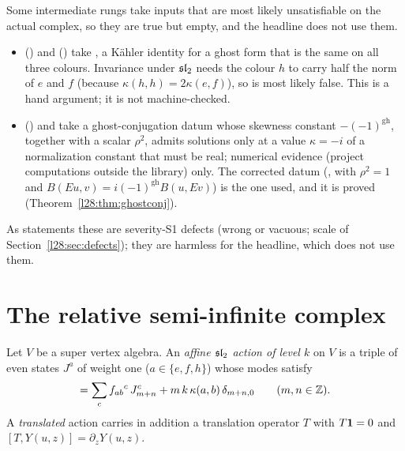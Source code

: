 \begin{warning}[title={Probably vacuous rungs}]\label{l28:warn:vacuous}
Some intermediate rungs take inputs that are most likely unsatisfiable on the actual complex, so they are true but empty, and the
headline does not use them.
\begin{itemize}
\item {} () and
   () take , a
  Kähler identity for a ghost form that is the same on all three colours. Invariance under $\mathfrak{sl}_2$ needs the colour
  $h$ to carry half the norm of $e$ and $f$ (because $\kappa(h,h)=2\kappa(e,f)$), so  is most likely false. This is a
  hand argument; it is not machine-checked.
\item {} () and  take a ghost-conjugation datum
   whose skewness constant $-(-1)^{\mathrm{gh}}$, together with a scalar $\rho^2$, admits solutions only at a
  value $\kappa=-i$ of a normalization constant that must be real; numerical evidence (project computations outside the library) only.
  The corrected datum (, with $\rho^2=1$ and $B(Eu,v)=i(-1)^{\mathrm{gh}}B(u,Ev)$) is the one used, and it is
  proved (Theorem~\ref{l28:thm:ghostconj}).
\end{itemize}
As statements these are severity-S1 defects (wrong or vacuous; scale of Section~\ref{l28:sec:defects}); they are harmless for the headline, which does not use them.
\end{warning}

\section{The relative semi-infinite complex}\label{l28:sec:brst}

\begin{definition}\label{l28:def:action}
Let $V$ be a super vertex algebra. An \emph{affine $\mathfrak{sl}_2$ action of level $k$} on $V$ is a triple of even states $J^a$
of weight one ($a\in\{e,f,h\}$) whose modes satisfy
\begin{equation*}
[J^a_m,J^b_n]=\sum_cf_{ab}{}^c\,J^c_{m+n}+m\,k\,\kappa(a,b)\,\delta_{m+n,0}\qquad(m,n\in\Z).
\end{equation*}
A \emph{translated} action carries in addition a translation operator $T$ with $T\mathbf 1=0$ and $[T,Y(u,z)]=\partial_zY(u,z)$.
\end{definition}

